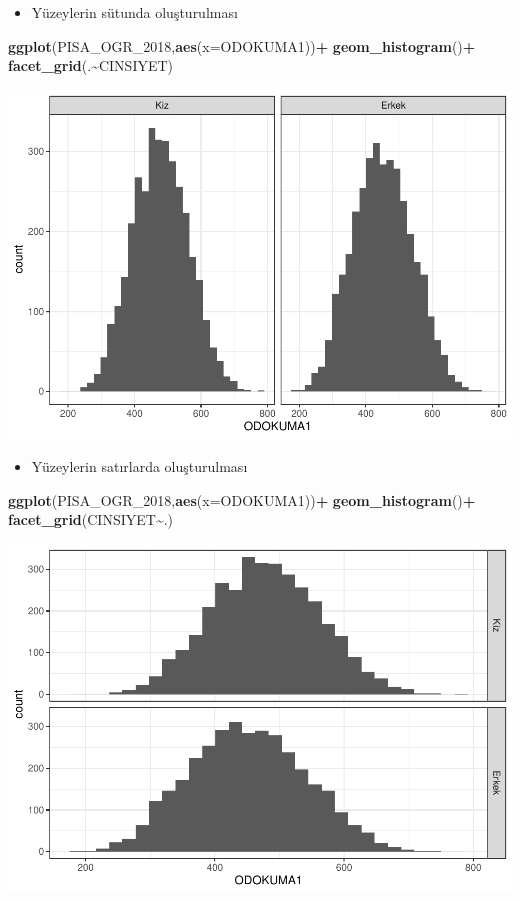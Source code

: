 \documentclass[
  oneside]{book}
\newenvironment{Shaded}{\begin{snugshade}}{\end{snugshade}}
\newcommand{\AttributeTok}[1]{\textcolor[rgb]{0.13,0.29,0.53}{#1}}
\newcommand{\FunctionTok}[1]{\textcolor[rgb]{0.13,0.29,0.53}{\textbf{#1}}}
\newcommand{\NormalTok}[1]{#1}
\newcommand{\SpecialCharTok}[1]{\textcolor[rgb]{0.81,0.36,0.00}{\textbf{#1}}}
\providecommand{\tightlist}{%
  \setlength{\itemsep}{0pt}\setlength{\parskip}{0pt}}
\begin{document}
\begin{itemize}
\tightlist
\item
  Yüzeylerin sütunda oluşturulması
\end{itemize}

\begin{Shaded}
\begin{Highlighting}[]
\FunctionTok{ggplot}\NormalTok{(PISA\_OGR\_2018,}\FunctionTok{aes}\NormalTok{(}\AttributeTok{x=}\NormalTok{ODOKUMA1))}\SpecialCharTok{+}
  \FunctionTok{geom\_histogram}\NormalTok{()}\SpecialCharTok{+}
  \FunctionTok{facet\_grid}\NormalTok{(.}\SpecialCharTok{\textasciitilde{}}\NormalTok{CINSIYET)}
\end{Highlighting}
\end{Shaded}

\begin{center}\includegraphics[width=0.4\linewidth]{15-betimleyici-istatistik_files/figure-latex/unnamed-chunk-32-1} \end{center}

\begin{itemize}
\tightlist
\item
  Yüzeylerin satırlarda oluşturulması
\end{itemize}

\begin{Shaded}
\begin{Highlighting}[]
\FunctionTok{ggplot}\NormalTok{(PISA\_OGR\_2018,}\FunctionTok{aes}\NormalTok{(}\AttributeTok{x=}\NormalTok{ODOKUMA1))}\SpecialCharTok{+}
  \FunctionTok{geom\_histogram}\NormalTok{()}\SpecialCharTok{+}
  \FunctionTok{facet\_grid}\NormalTok{(CINSIYET}\SpecialCharTok{\textasciitilde{}}\NormalTok{.)}
\end{Highlighting}
\end{Shaded}

\begin{center}\includegraphics[width=0.4\linewidth]{15-betimleyici-istatistik_files/figure-latex/unnamed-chunk-33-1} \end{center}
\end{document}

